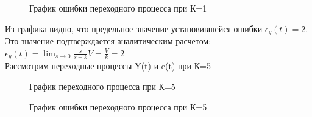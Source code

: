 \documentclass[a4paper, 11pt]{article}
\begin{document}
\begin{figure}[h!]
    \caption{График ошибки переходного процесса при К=1}
    \label{tree}
\end{figure}

\newpage

Из графика видно, что предельное значение установившейся ошибки $\epsilon_y(t)=2$. Это значение подтверждается аналитическим расчетом: $\epsilon_y(t)=\lim_{s\to0}\frac{s}{s+k}V=\frac{V}{k}=2$\\

Рассмотрим переходные процессы Y(t) и e(t) при К=5

\begin{figure}[h!]
    \caption{График переходного процесса при К=5}
    \label{two}
\end{figure}

\begin{figure}[h!]
    \caption{График ошибки переходного процесса при К=5}
    \label{tree}
\end{figure}
\end{document}
